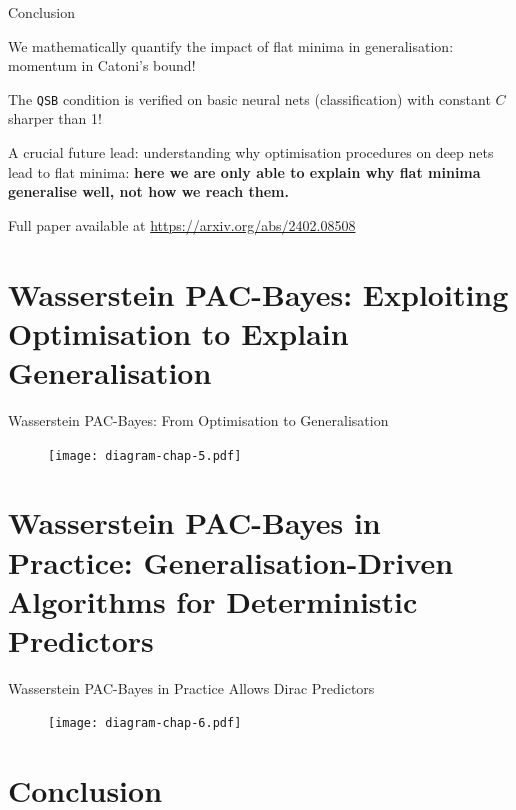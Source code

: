 \documentclass{presentation}
\begin{document}
\begin{xframe}{Conclusion}
    \vspace{1cm}
    \Large
    \begin{xitemize}
        \item We mathematically quantify the impact of flat minima in generalisation: momentum in Catoni's bound!
        \item The \texttt{QSB} condition is verified on basic neural nets (classification) with constant $C$ sharper than 1! 
        \item A crucial future lead: understanding why optimisation procedures on deep nets lead to flat minima: \textbf{here we are only able to explain why flat minima generalise well, not how we reach them.}
    \end{xitemize}

    Full paper available at \url{https://arxiv.org/abs/2402.08508}
    
\end{xframe}

\section{Wasserstein PAC-Bayes: Exploiting Optimisation to Explain Generalisation}

\begin{xframe}{Wasserstein PAC-Bayes: From Optimisation to Generalisation}
    \begin{figure}
        \centering
        \texttt{[image: diagram-chap-5.pdf]}
    \end{figure}
  \end{xframe}


\section{Wasserstein PAC-Bayes in Practice: Generalisation-Driven Algorithms for Deterministic Predictors}

\begin{xframe}{Wasserstein PAC-Bayes in Practice Allows Dirac Predictors}
    \begin{figure}
        \centering
        \texttt{[image: diagram-chap-6.pdf]}
    \end{figure}
  \end{xframe}


\section{Conclusion}
\end{document}
